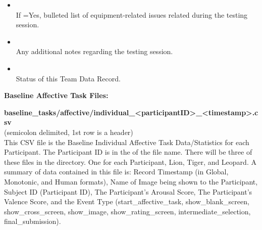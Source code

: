 \begin{description}
\begin{itemize}
    \item {}\\If {}=Yes, bulleted list of equipment-related issues related during the testing session.
    \item {}\\Any additional notes regarding the testing session.
    \item {}\\Status of this Team Data Record.
\end{itemize}

\bigskip\item\textbf{Baseline Affective Task Files:}
\medskip
\item\textbf{baseline\_tasks/affective/individual\_<participantID>\_<timestamp>.csv}\\(semicolon delimited, 1st row is a header)\\
This CSV file is the Baseline Individual Affective Task Data/Statistics for each Participant. The Participant ID is in the of the file name. There will be three of these files in the directory. One for each Participant, Lion, Tiger, and Leopard. A summary of data contained in this file is: Record Timestamp (in Global, Monotonic, and Human formats), Name of Image being shown to the Participant, Subject ID (Participant ID), The Participant's Arousal Score, The Participant's Valence Score, and the Event Type (start\_affective\_task, show\_blank\_screen, show\_cross\_screen, show\_image, show\_rating\_screen, intermediate\_selection, final\_submission).


\end{description}
